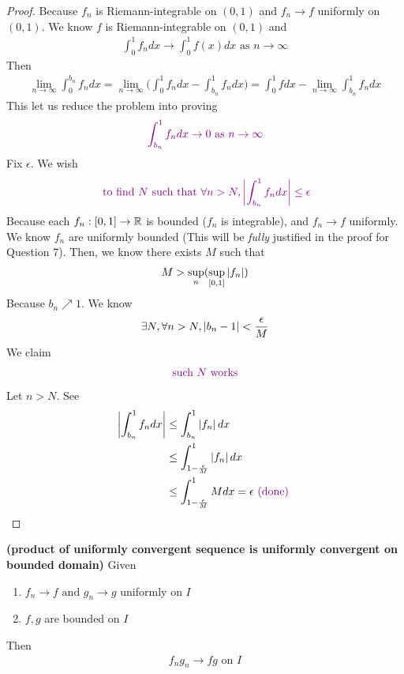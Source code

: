 \documentclass{report}
\begin{document}
\begin{proof}
Because $f_n$ is Riemann-integrable on $(0,1)$ and $f_n\to f$ uniformly on $(0,1)$. We know $f$ is Riemann-integrable on  $(0,1)$ and  
\begin{align*}
\int_0^1 f_ndx \to \int_0^1 f(x)dx\text{ as }n\to \infty
\end{align*}
Then 
\begin{align*}
\lim_{n\to \infty}\int_0^{b_n}f_ndx=\lim_{n\to \infty}\Big(\int_0^1 f_ndx-\int_{b_n}^1 f_ndx \Big)=\int_0^1 fdx-\lim_{n\to \infty}\int_{b_n}^1 f_ndx
\end{align*}
This let us reduce the problem into proving 
\begin{align*}
\textcolor{violet}{\int_{b_n}^1 f_ndx \to 0\text{ as }n \to \infty}
\end{align*}
Fix $\epsilon $. We wish 
\begin{align*}
\textcolor{violet}{\text{ to find $N$ such that }\forall n>N, \left|\int_{b_n}^1 f_ndx\right|\leq  \epsilon }
\end{align*}
Because each $f_n:[0,1]\rightarrow \mathbb{R}$ is bounded  ($f_n$ is integrable), and $f_n \to f$ uniformly. We know $f_n$ are uniformly bounded (This will be \textit{fully} justified in the proof for  Question 7). Then, we know there exists $M$ such that 
\begin{align*}
M> \sup_n (\sup_{[0,1]} \left|f_n\right|) 
\end{align*}
Because $b_n \nearrow 1$. We know 
\begin{align*}
\exists N, \forall n>N, \left|b_n-1\right| < \frac{\epsilon}{M}
\end{align*}
We claim 
\begin{align*}
\textcolor{violet}{\text{ such $N$ works }}
\end{align*}
Let $n>N$. See 
 \begin{align*}
   \left|\int_{b_n}^1 f_ndx\right|&\leq \int_{b_n}^1 \left|f_n\right|dx\\
   &\leq \int_{1-\frac{\epsilon}{M}}^1 \left|f_n\right|dx\\
   &\leq \int_{1-\frac{\epsilon}{M}}^1 Mdx=\epsilon \textcolor{violet}{\text{ (done) }}
\end{align*}
\end{proof}
\begin{lemma}
\label{pouc}
\textbf{(product of uniformly convergent sequence is uniformly convergent on bounded domain)} Given 
\begin{enumerate}[label=(\alph*)]
   \item $f_n\to f\text{ and }g_n\to g$ uniformly on $I$
  \item $f,g$ are bounded on $I$ 
\end{enumerate}
Then 
\begin{align*}
f_ng_n \to fg\text{ on }I
\end{align*}
\end{lemma}
\end{document}
